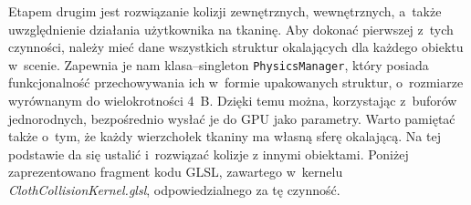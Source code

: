 		
		Etapem drugim jest rozwiązanie kolizji zewnętrznych, wewnętrznych, a~także uwzględnienie działania użytkownika na tkaninę. Aby dokonać pierwszej z~tych czynności, należy mieć dane wszystkich struktur okalających dla każdego obiektu w~scenie. Zapewnia je nam klasa--singleton \texttt{PhysicsManager}, który posiada funkcjonalność przechowywania ich w~formie upakowanych struktur, o~rozmiarze wyrównanym do wielokrotności 4~B. Dzięki temu można, korzystając z~buforów jednorodnych, bezpośrednio wysłać je do GPU jako parametry. Warto pamiętać także o~tym, że każdy wierzchołek tkaniny ma własną sferę okalającą. Na tej podstawie da się ustalić i~rozwiązać kolizje z innymi obiektami. Poniżej zaprezentowano fragment kodu GLSL, zawartego w~kernelu \emph{ClothCollisionKernel.glsl}, odpowiedzialnego za tę czynność.
		
